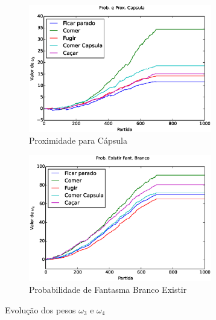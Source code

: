 \begin{figure}[h]
	\centering
	\begin{subfigure}[t]{.5\textwidth}
		\centering
		\includegraphics[width=80mm]{images/5_behaviors_original_map/weights____pol__DistCapsula}
		\caption{Proximidade para Cápsula}
		\label{img:5ComportamentosMapaOriginal:PesoDistCapsula}
	\end{subfigure}%
	\begin{subfigure}[t]{.5\textwidth}
		\centering
		\includegraphics[width=80mm]{images/5_behaviors_original_map/weights____pol__ProbExistirCapsula}
		\caption{Probabilidade de Fantasma Branco Existir}
		\label{img:5ComportamentosMapaOriginal:PesoProbFantasmaBrancoExistir}
	\end{subfigure}
	\caption{Evolução dos pesos $ \omega_3 $ e $ \omega_4 $}
	\label{img:5ComportamentosMapaOriginal:PesoDistCapsulaOuProbCapsulaExistir}
\end{figure}

